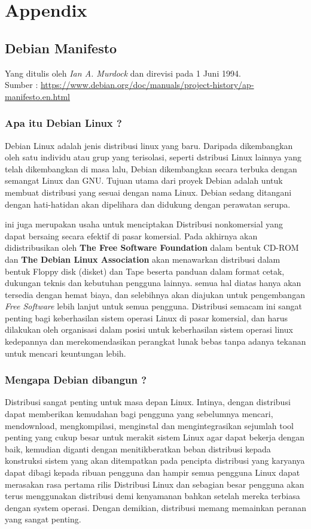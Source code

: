 \appendix
\chapter{Appendix}

\section{Debian Manifesto}
\label{appdx::deb_manifesto}
\noindent
Yang ditulis oleh \textit{Ian A. Murdock} dan direvisi pada 1 Juni 1994.\\
Sumber :
{\scriptsize \url{https://www.debian.org/doc/manuals/project-history/ap-manifesto.en.html}}

\subsection{Apa itu Debian Linux ?}
Debian Linux adalah jenis distribusi linux yang baru. Daripada dikembangkan oleh satu individu atau grup yang terisolasi, seperti dstribusi Linux lainnya yang telah dikembangkan di masa lalu, Debian dikembangkan secara terbuka dengan semangat Linux dan GNU. Tujuan utama dari proyek Debian adalah untuk membuat distribusi yang sesuai dengan nama Linux. Debian sedang ditangani dengan hati-hatidan akan dipelihara dan didukung dengan perawatan serupa.

\noindent
ini juga merupakan usaha untuk menciptakan Distribusi nonkomersial yang dapat bersaing secara efektif di pasar komersial. Pada akhirnya akan didistribusikan oleh \textbf{The Free Software Foundation} dalam bentuk CD-ROM dan \textbf{The Debian Linux Association} akan menawarkan distribusi dalam bentuk Floppy disk (disket) dan Tape beserta panduan dalam format cetak, dukungan teknis dan kebutuhan pengguna lainnya. semua hal diatas hanya akan tersedia dengan hemat biaya, dan selebihnya akan diajukan untuk pengembangan \textit{Free Software} lebih lanjut untuk semua pengguna. Distribusi semacam ini sangat penting bagi keberhasilan sistem operasi Linux di pasar komersial, dan harus dilakukan oleh organisasi dalam posisi untuk keberhasilan sistem operasi linux kedepannya dan merekomendasikan perangkat lunak bebas tanpa adanya tekanan untuk mencari keuntungan lebih.

\subsection{Mengapa Debian dibangun ?}
Distribusi sangat penting untuk masa depan Linux. Intinya, dengan distribusi dapat memberikan kemudahan bagi pengguna yang sebelumnya mencari, mendownload, mengkompilasi, menginstal dan mengintegrasikan sejumlah tool penting yang cukup besar untuk merakit sistem Linux agar dapat bekerja dengan baik, kemudian diganti dengan menitikberatkan beban distribusi kepada konstruksi sistem yang akan ditempatkan pada pencipta distribusi yang karyanya dapat dibagi kepada ribuan pengguna dan hampir semua pengguna Linux dapat merasakan rasa pertama rilis Distribusi Linux dan sebagian besar pengguna akan terus menggunakan distribusi demi kenyamanan bahkan setelah mereka terbiasa dengan system operasi. Dengan demikian, distribusi memang memainkan peranan yang sangat penting.

